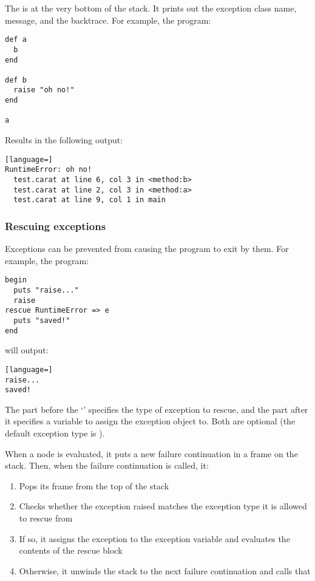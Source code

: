 The  is at the very bottom of the stack. It prints out the exception class name, message, and the backtrace. For example, the program:

\begin{lstlisting}
def a
  b
end

def b
  raise "oh no!"
end

a
\end{lstlisting}

Results in the following output:

\begin{lstlisting}[language=]
RuntimeError: oh no!
  test.carat at line 6, col 3 in <method:b>
  test.carat at line 2, col 3 in <method:a>
  test.carat at line 9, col 1 in main
\end{lstlisting}

\subsubsection{Rescuing exceptions}

Exceptions can be prevented from causing the program to exit by  them. For example, the program:

\begin{lstlisting}
begin
  puts "raise..."
  raise
rescue RuntimeError => e
  puts "saved!"
end
\end{lstlisting}

will output:

\begin{lstlisting}[language=]
raise...
saved!
\end{lstlisting}

The part before the `\code{=>}' specifies the type of exception to rescue, and the part after it specifies a variable to assign the exception object to. Both are optional (the default exception type is ).

When a  node is evaluated, it puts a new failure continuation in a frame on the stack. Then, when the failure continuation is called, it:

\begin{enumerate}
  \item Pops its frame from the top of the stack
  \item Checks whether the exception raised matches the exception type it is allowed to rescue from
  \item If so, it assigns the exception to the exception variable and evaluates the contents of the rescue block
  \item Otherwise, it unwinds the stack to the next failure continuation and calls that
\end{enumerate}
